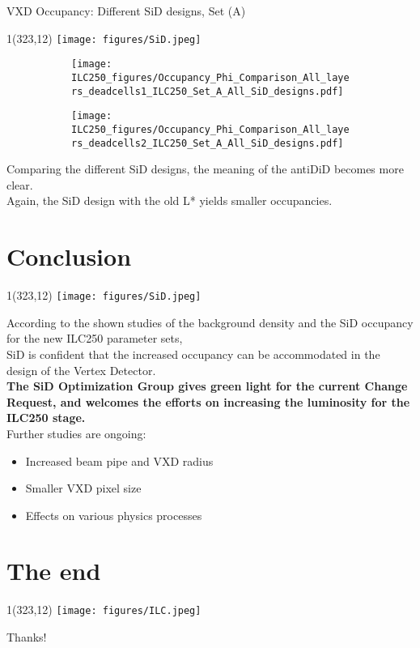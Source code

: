 \documentclass[xcolor={dvipsnames}]{beamer}
\newcommand{\sidlogo}{
  \setlength{\TPHorizModule}{1pt}
  \setlength{\TPVertModule}{1pt}
  \begin{textblock}{1}(323,12)
   \texttt{[image: figures/SiD.jpeg]}
  \end{textblock}
  }
\newcommand{\ilclogo}{
  \setlength{\TPHorizModule}{1pt}
  \setlength{\TPVertModule}{1pt}
  \begin{textblock}{1}(323,12)
   \texttt{[image: figures/ILC.jpeg]}
  \end{textblock}
}
\begin{document}
\begin{frame}{VXD Occupancy: Different SiD designs, Set (A)}
\sidlogo
\begin{figure}
\centering
\begin{subfigure}[t]{0.48\textwidth}
\centering
\texttt{[image: ILC250\_figures/Occupancy\_Phi\_Comparison\_All\_layers\_deadcells1\_ILC250\_Set\_A\_All\_SiD\_designs.pdf]}
 \end{subfigure}
\hspace*{0.2cm}
\begin{subfigure}[t]{0.48\textwidth}
\centering
\texttt{[image: ILC250\_figures/Occupancy\_Phi\_Comparison\_All\_layers\_deadcells2\_ILC250\_Set\_A\_All\_SiD\_designs.pdf]}
\end{subfigure}
\end{figure}
Comparing the different SiD designs, the meaning of the antiDiD becomes more clear.\\
Again, the SiD design with the old L* yields smaller occupancies.
\end{frame}

\section{Conclusion}
\begin{frame}
\sidlogo
 According to the shown studies of the background density and the SiD occupancy for the new ILC250 parameter sets,\\
 \alert{SiD is confident that the increased occupancy can be accommodated in the design of the Vertex Detector.}\\
 \textbf{The SiD Optimization Group gives green light for the current Change Request, and welcomes the efforts on increasing the luminosity for the ILC250 stage.}\\
 \vspace*{0.5cm}
 Further studies are ongoing:
 \begin{itemize}
  \item Increased beam pipe and VXD radius
  \item Smaller VXD pixel size
  \item Effects on various physics processes
 \end{itemize}

\end{frame}



\section*{The end}
{
\begin{frame}
\ilclogo
\begin{center}
\textcolor{RubineRed}{
	\LARGE Thanks!\\
}
\end{center}
\end{frame}
}
\end{document}
